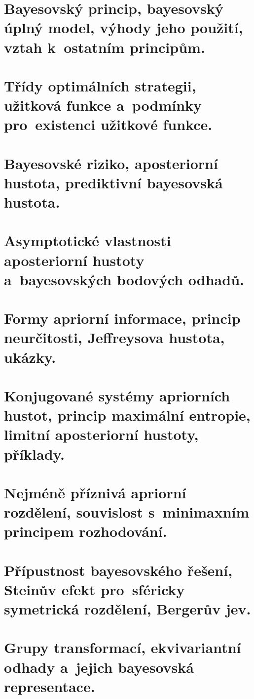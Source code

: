 
\chapter{Bayesovský princip, bayesovský úplný model, výhody jeho použití, vztah k~ostatním principům.}


\chapter{Třídy optimálních strategii, užitková funkce a~podmínky pro~existenci užitkové funkce.}


\chapter{Bayesovské riziko, aposteriorní hustota, prediktivní bayesovská hustota.}


\chapter{Asymptotické vlastnosti aposteriorní hustoty a~bayesovských bodových odhadů.}


\chapter{Formy apriorní informace, princip neurčitosti, Jeffreysova hustota, ukázky.}


\chapter{Konjugované systémy apriorních hustot, princip maximální entropie, limitní aposteriorní hustoty, příklady.}


\chapter{Nejméně příznivá apriorní rozdělení, souvislost s~minimaxním principem rozhodování.}


\chapter{Přípustnost bayesovského řešení, Steinův efekt pro~sféricky symetrická rozdělení, Bergerův jev.}


\chapter{Grupy transformací, ekvivariantní odhady a~jejich bayesovská representace.}


